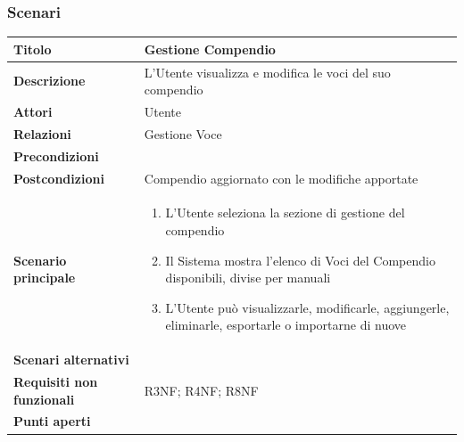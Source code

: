 \documentclass[a4paper, 11pt]{article}
\begin{document}
\subsubsection{Scenari}
\begin{center}

\begin{tabular}{ |p{5cm}|p{9.5cm}|  }
\hline
\textbf{Titolo} & Gestione Compendio \\
\hline
\textbf{Descrizione} & L'Utente visualizza e modifica le voci del suo compendio \\
\hline
\textbf{Attori} & Utente  \\
\hline
\textbf{Relazioni} & Gestione Voce \\
\hline
\textbf{Precondizioni} &  \\
\hline
\textbf{Postcondizioni} & Compendio aggiornato con le modifiche apportate \\
\hline
\textbf{Scenario principale} & 
\begin{enumerate}
    \item L'Utente seleziona la sezione di gestione del compendio
    \item Il Sistema mostra l'elenco di Voci del Compendio disponibili, divise per manuali
    \item L'Utente può visualizzarle, modificarle, aggiungerle, eliminarle, esportarle o importarne di nuove
\end{enumerate}
\\
\hline
\textbf{Scenari alternativi} & \\
\hline
    \textbf{Requisiti non funzionali} & R3NF; R4NF; R8NF \\
\hline
\textbf{Punti aperti} &  \\
\hline
\end{tabular}

\vspace{3em}


\end{center}
\end{document}
